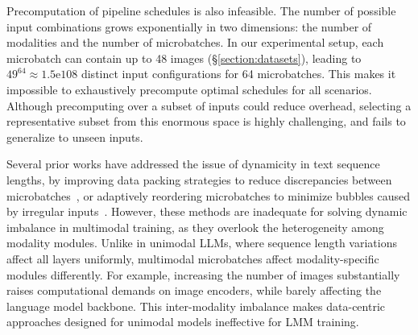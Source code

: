 Precomputation of pipeline schedules is also infeasible. The number of possible input combinations grows exponentially in two dimensions: the number of modalities and the number of microbatches. In our experimental setup, each microbatch can contain up to 48 images (\S\ref{section:datasets}), leading to $49^{64} \approx 1.5\mathrm{e}108$ distinct input configurations for 64 microbatches. This makes it impossible to exhaustively precompute optimal schedules for all scenarios. Although precomputing over a subset of inputs could reduce overhead, selecting a representative subset from this enormous space is highly challenging, and fails to generalize to unseen inputs.

Several prior works have addressed the issue of dynamicity in text sequence lengths,
by improving data packing strategies to reduce discrepancies between microbatches~\cite{wlb-llm-osdi25},
or adaptively reordering microbatches to minimize bubbles caused by irregular inputs~\cite{dynapipe-eurosys24,flexpipe-atc25}.
However, these methods are inadequate for solving dynamic imbalance in multimodal training, as they overlook the heterogeneity among modality modules.
Unlike in unimodal LLMs, where sequence length variations affect all layers uniformly, multimodal microbatches affect modality-specific modules differently. For example, increasing the number of images substantially raises computational demands on image encoders, while barely affecting the language model backbone. This inter-modality imbalance makes data-centric approaches designed for unimodal models ineffective for LMM training.
